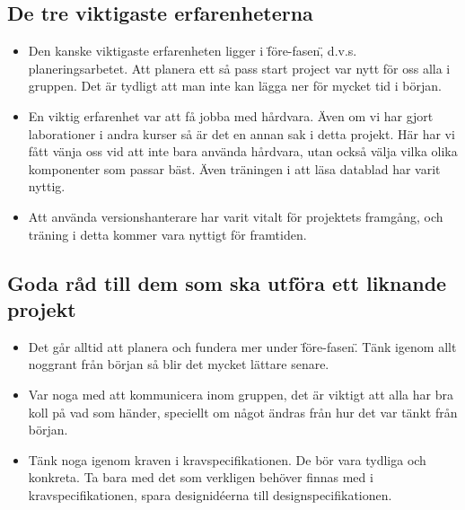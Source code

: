 \documentclass[a4paper,12pt]{article}
\begin{document}
\subsection{De tre viktigaste erfarenheterna}
\begin{itemize}
\item Den kanske viktigaste erfarenheten ligger i \"före-fasen\", d.v.s. planeringsarbetet. Att planera ett
så pass start project var nytt för oss alla i gruppen. Det är tydligt att man inte kan lägga ner för mycket 
tid i början. 
\item En viktig erfarenhet var att få jobba med hårdvara. Även om vi har gjort laborationer i andra kurser
så är det en annan sak i detta projekt. Här har vi fått vänja oss vid att inte bara använda hårdvara, utan också
välja vilka olika komponenter som passar bäst. Även träningen i att läsa datablad har varit nyttig. 
\item Att använda versionshanterare har varit vitalt för projektets framgång, och träning i detta kommer vara nyttigt
för framtiden. 
\end{itemize}

\subsection{Goda råd till dem som ska utföra ett liknande projekt}
\begin{itemize}
\item Det går alltid att planera och fundera mer under \"före-fasen\". Tänk igenom allt noggrant från början
så blir det mycket lättare senare. 
\item Var noga med att kommunicera inom gruppen, det är viktigt att alla har bra koll på vad som händer, 
speciellt om något ändras från hur det var tänkt från början. 
\item Tänk noga igenom kraven i kravspecifikationen. De bör vara tydliga och konkreta. Ta bara med det 
som verkligen behöver finnas med i kravspecifikationen, spara designidéerna till designspecifikationen. 
\end{itemize}
\end{document}
